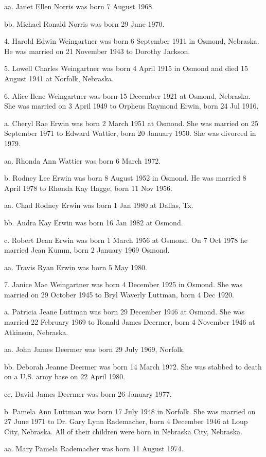 \documentclass[a4paper]{article}
\begin{document}
aa. Janet Ellen Norris was born 7 August 1968.

bb. Michael Ronald Norris was born 29 June 1970.

4. Harold Edwin Weingartner was born 6 September 1911 in Osmond, Nebraska. He was married on 21 November 1943 to Dorothy Jackson.

5. Lowell Charles Weingartner was born 4 April 1915 in Osmond and died 15 August 1941 at Norfolk, Nebraska.

6. Alice Ilene Weingartner was born 15 December 1921 at Osmond, Nebraska. She was married on 3 April 1949 to Orpheus Raymond Erwin, born 24 Jul 1916.

a. Cheryl Rae Erwin was born 2 March 1951 at Osmond.  She was married on 25 September 1971 to Edward Wattier, born 20 January 1950. She was divorced in 1979.

aa. Rhonda Ann Wattier was born 6 March 1972.

b. Rodney Lee Erwin was born 8 August 1952 in Osmond.  He was married 8 April 1978 to Rhonda Kay Hagge, born 11 Nov 1956.

aa. Chad Rodney Erwin was born 1 Jan 1980 at Dallas, Tx.

bb. Audra Kay Erwin was born 16 Jan 1982 at Osmond.

c. Robert Dean Erwin was born 1 March 1956 at Osmond. On 7 Oct 1978 he married Jean Kumm, born 2 January 1969 Osmond.

aa. Travis Ryan Erwin was born 5 May 1980.

7. Janice Mae Weingartner was born 4 December 1925 in Osmond.  She was married on 29 October 1945 to Bryl Waverly Luttman, born 4 Dec 1920.
 
a. Patricia Jeane Luttman was born 29 December 1946 at Osmond. She was married 22 February 1969 to Ronald James Deermer, born 4 November 1946 at Atkinson, Nebraska.
 
aa. John James Deermer was born 29 July 1969, Norfolk.

bb. Deborah Jeanne Deermer was born 14 March 1972.  She was stabbed to death on a U.S. army base on 22 April 1980.

cc. David James Deermer was born 26 January 1977.

b. Pamela Ann Luttman was born 17 July 1948 in Norfolk.  She was married on 27 June 1971 to Dr. Gary Lynn Rademacher, born 4 December 1946 at Loup City, Nebraska. All of their children were born in Nebraska City, Nebraska.

aa. Mary Pamela Rademacher was born 11 August 1974.
\end{document}
